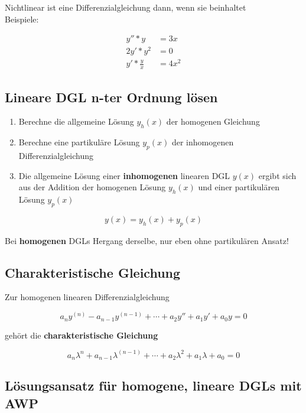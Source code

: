 \documentclass[12pt, a4paper]{scrreprt}
\begin{document}
Nichtlinear ist eine Differenzialgleichung dann, wenn sie  beinhaltet\\[1em]
Beispiele:

  \begin{align*}
    y''*y &=3x\\
    2y'*y^2 &=0\\
    y'*\frac{y}{x} &= 4x^2
  \end{align*}

\subsection{Lineare DGL n-ter Ordnung lösen}

\begin{enumerate}
\item Berechne die allgemeine Lösung \(y_h(x)\) der homogenen Gleichung
\item Berechne eine partikuläre Lösung \(y_p(x)\) der inhomogenen Differenzialgleichung
\item Die allgemeine Lösung einer \textbf{inhomogenen} linearen DGL \(y(x)\) ergibt sich aus der Addition der homogenen Lösung \(y_h(x)\) und einer partikulären Lösung \(y_p(x)\)
\end{enumerate}

\[
  y(x)=y_h(x)+y_p(x)
\]

Bei \textbf{homogenen} DGLs Hergang derselbe, nur eben ohne partikulären Ansatz!

\subsection{Charakteristische Gleichung}

Zur homogenen linearen Differenzialgleichung

\[
  a_n y^{(n)}-a_{n-1}y^{(n-1)}+ \cdots +a_2y''+a_1y'+a_0y=0
\]

gehört die \textbf{charakteristische Gleichung}

\[
  a_n\lambda^n+a_{n-1}\lambda^{(n-1)}+ \cdots + a_2\lambda^2+a_1\lambda+a_0=0
\]

\subsection{Lösungsansatz für homogene, lineare DGLs mit AWP}
\end{document}
